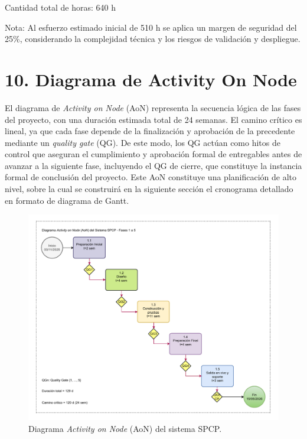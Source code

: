 \documentclass[12pt]
{charter}
\begin{document}
Cantidad total de horas: 640 h

Nota: Al esfuerzo estimado inicial de 510 h se aplica un margen de seguridad del 25\%, considerando la complejidad técnica y los riesgos de validación y despliegue. 


\section{10. Diagrama de Activity On Node}
\label{sec:AoN}

El diagrama de \textit{Activity on Node} (AoN) representa la secuencia lógica de las fases del proyecto, con una duración estimada total de 24 semanas. 
El camino crítico es lineal, ya que cada fase depende de la finalización y aprobación de la precedente mediante un \textit{quality gate} (QG). 
De este modo, los QG actúan como hitos de control que aseguran el cumplimiento y aprobación formal de entregables antes de avanzar a la siguiente fase, incluyendo el QG de cierre, que constituye la instancia formal de conclusión del proyecto. 
Este AoN constituye una planificación de alto nivel, sobre la cual se construirá en la siguiente sección el cronograma detallado en formato de diagrama de Gantt.

\begin{figure}[ht]
  \centering
  \includegraphics[width=\textwidth]{Figuras/TF_AoN_00.drawio.pdf}
  \caption{Diagrama \textit{Activity on Node} (AoN) del sistema SPCP.}
  \label{fig:TF_AoN_00}
\end{figure}
\end{document}

